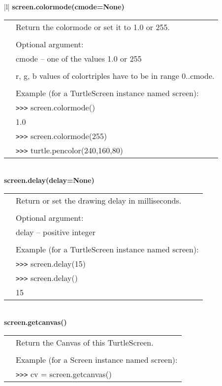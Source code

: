 \begin{center}
{\begin{tabular}{|l|}
{\bf    screen.colormode(cmode=None)} \\
   \begin{tabular}{p{0.25in}p{4in}}
&        Return the colormode or set it to 1.0 or 255. \\
&  \\
&        Optional argument: \\
&        cmode -- one of the values 1.0 or 255 \\
&  \\
&        r, g, b values of colortriples have to be in range 0..cmode. \\
&  \\
&        Example (for a TurtleScreen instance named screen): \\
&        \verb+>+\verb+>+\verb+>+ screen.colormode() \\
&        1.0 \\
&        \verb+>+\verb+>+\verb+>+ screen.colormode(255) \\
&        \verb+>+\verb+>+\verb+>+ turtle.pencolor(240,160,80) \\
\end{tabular} \\ \hline
{\bf    screen.delay(delay=None)} \\
   \begin{tabular}{p{0.25in}p{4in}}
&        Return or set the drawing delay in milliseconds. \\
&  \\
&        Optional argument: \\
&        delay -- positive integer \\
&  \\
&        Example (for a TurtleScreen instance named screen): \\
&        \verb+>+\verb+>+\verb+>+ screen.delay(15) \\
&        \verb+>+\verb+>+\verb+>+ screen.delay() \\
&        15 \\
\end{tabular} \\ \hline
{\bf    screen.getcanvas()} \\
   \begin{tabular}{p{0.25in}p{4in}}
&        Return the Canvas of this TurtleScreen. \\
&  \\
&        Example (for a Screen instance named screen): \\
&        \verb+>+\verb+>+\verb+>+ cv = screen.getcanvas() \\

\end{tabular}
\end{tabular}}
\end{center}

